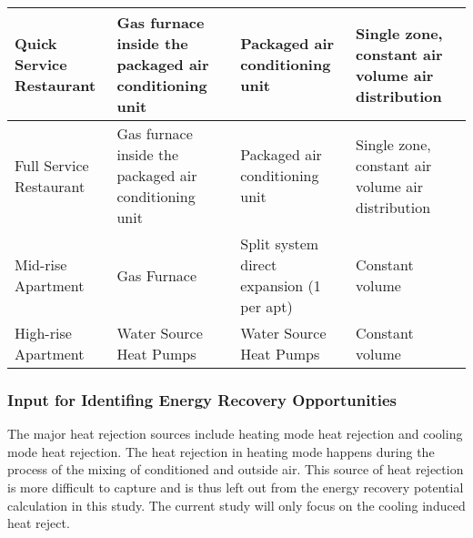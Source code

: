 \begin{table}[h!]
\begin{longtable}{p{2cm}|p{2cm}|p{4cm}|p{4cm}}
  \hline
  Quick Service Restaurant     & Gas furnace inside the packaged air conditioning unit                           & Packaged air conditioning unit                                               & Single zone, constant air volume air distribution                                                                                                                      \\
  \hline
  Full Service Restaurant      & Gas furnace inside the packaged air conditioning unit                           & Packaged air conditioning unit                                               & Single zone, constant air volume air distribution                                                                                                                      \\
  \hline
  Mid-rise Apartment           & Gas Furnace                                                                     & Split system direct expansion (1 per apt)                                                  & Constant volume                                                                                                                                                        \\
  \hline
  High-rise Apartment          & Water Source Heat Pumps                                                         & Water Source Heat Pumps                                                      & Constant volume                                                                                                                                                      \\ 
  \hline
\end{longtable}
\end{table}

\pagebreak
\subsubsection{Input for Identifing Energy Recovery
  Opportunities}\label{sec:inputRecover}
The major heat rejection sources include heating mode heat rejection
and cooling mode heat rejection. The heat rejection in heating mode
happens during the process of the mixing of conditioned and outside
air. This source of heat rejection is more difficult to capture and is
thus left out from the energy recovery potential calculation in this
study. The current study will only focus on the cooling induced heat
reject. 

